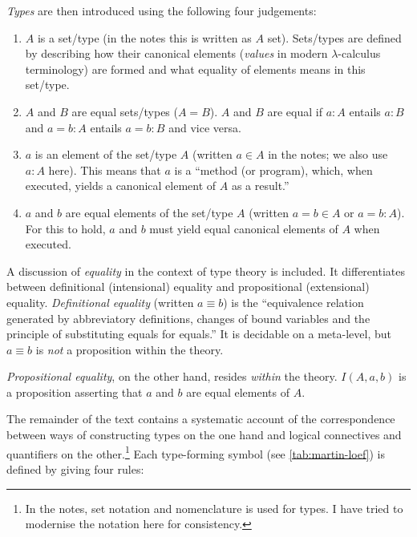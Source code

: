 \documentclass[12pt,toc=bibliography,numbers=noendperiod,
               footnotes=multiple,twoside]{scrartcl}
\begin{document}
\begin{prooftree}
\end{prooftree}

\emph{Types} are then introduced using the following four judgements:

\begin{enumerate}
\item \(A\) is a set/type (in the notes this is written as \(A\) set). Sets/types are defined by describing how their canonical elements (\emph{values} in modern \(\lambda\)-calculus terminology) are formed and what equality of elements means in this set/type.
\item \(A\) and \(B\) are equal sets/types (\(A = B\)). \(A\) and \(B\) are equal if \(a : A\) entails \(a : B\) and \(a = b : A\) entails \(a = b : B\) and vice versa.
\item \(a\) is an element of the set/type \(A\) (written \(a \in A\) in the notes; we also use \(a : A\) here). This means that \(a\) is a \enquote{method (or program), which, when executed, yields a canonical element of \(A\) as a result.}
\item \(a\) and \(b\) are equal elements of the set/type \(A\) (written \(a = b \in A\) or \(a = b : A\)). For this to hold, \(a\) and \(b\) must yield equal canonical elements of \(A\) when executed.
\end{enumerate}

A discussion of \emph{equality} in the context of type theory is included. It differentiates between definitional (intensional) equality and propositional (extensional) equality. \emph{Definitional equality} (written \(a \equiv b\)) is the \enquote{equivalence relation generated by abbreviatory definitions, changes of bound variables and the principle of substituting equals for equals.} It is decidable on a meta-level, but \(a \equiv b\) is \emph{not} a proposition within the theory.

\emph{Propositional equality}, on the other hand, resides \emph{within} the theory. \(I(A, a, b)\) is a proposition asserting that \(a\) and \(b\) are equal elements of \(A\).

The remainder of the text contains a systematic account of the correspondence between ways of constructing types on the one hand and logical connectives and quantifiers on the other.\footnote{In the notes, set notation and nomenclature is used for types. I have tried to modernise the notation here for consistency.} Each type-forming symbol (see \cref{tab:martin-loef}) is defined by giving four rules:
\end{document}
